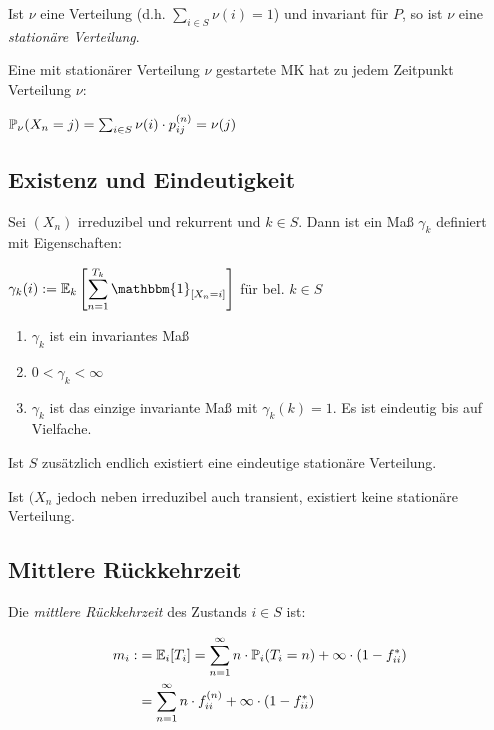 \vspace*{1mm}

Ist $\nu$ eine Verteilung (d.h. $\sum_{i \in S} \nu(i) = 1$) und invariant für $P$, so ist $\nu$ eine \emph{stationäre Verteilung}.

\vspace*{1mm}

Eine mit stationärer Verteilung $\nu$ gestartete MK hat zu jedem Zeitpunkt Verteilung $\nu$:

$\P_\nu(X_n = j) = \sum_{i \in S} \nu(i) \cdot p_{ij}^{(n)} = \nu(j)$

\subsection*{Existenz und Eindeutigkeit}

Sei $(X_n)$ irreduzibel und rekurrent und $k \in S$. Dann ist ein Maß $\gamma_k$ definiert mit Eigenschaften:

$\gamma_k(i) := \mathbb{E}_k\left[\displaystyle\sum_{n=1}^{T_k} \mathbbm{1}_{[X_n=i]}\right]$ für bel. $k \in S$

\begin{enumerate}[label=(\alph*)]
	\item $\gamma_k$ ist ein invariantes Maß
	\item $0 < \gamma_k < \infty$
	\item $\gamma_k$ ist das einzige invariante Maß mit $\gamma_k(k) = 1$. Es ist eindeutig bis auf Vielfache.
\end{enumerate}

Ist $S$ zusätzlich endlich existiert eine eindeutige stationäre Verteilung.

Ist $(X_n$ jedoch neben irreduzibel auch transient, existiert keine stationäre Verteilung.

\subsection*{Mittlere Rückkehrzeit}

Die \emph{mittlere Rückkehrzeit} des Zustands $i \in S$ ist:

\vspace*{-4mm}
\begin{align*}
m_i :&= \mathbb{E}_i[T_i] = \sum_{n=1}^\infty n \cdot \P_i(T_i = n) + \infty \cdot (1-f_{ii}^*) \\
&= \sum_{n=1}^\infty n \cdot f_{ii}^{(n)} + \infty \cdot (1- f_{ii}^*)
\end{align*}

